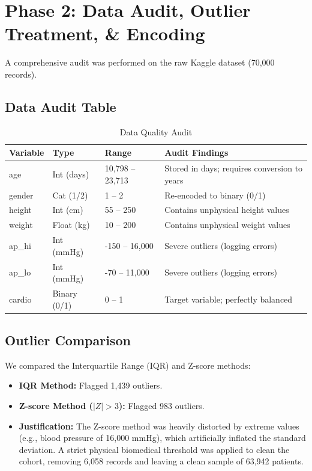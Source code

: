 \documentclass[11pt,a4paper]{article}
\begin{document}
\section{Phase 2: Data Audit, Outlier Treatment, \& Encoding}
A comprehensive audit was performed on the raw Kaggle dataset (70,000 records). 
\subsection{Data Audit Table}
\begin{table}[htbp]
\centering
\caption{Data Quality Audit}
\begin{tabular}{llll}
\toprule
Variable & Type & Range & Audit Findings \\
\midrule
age & Int (days) & 10,798 -- 23,713 & Stored in days; requires conversion to years \\
gender & Cat (1/2) & 1 -- 2 & Re-encoded to binary (0/1) \\
height & Int (cm) & 55 -- 250 & Contains unphysical height values \\
weight & Float (kg) & 10 -- 200 & Contains unphysical weight values \\
ap\_hi & Int (mmHg) & -150 -- 16,000 & Severe outliers (logging errors) \\
ap\_lo & Int (mmHg) & -70 -- 11,000 & Severe outliers (logging errors) \\
cardio & Binary (0/1) & 0 -- 1 & Target variable; perfectly balanced \\
\bottomrule
\end{tabular}
\end{table}

\subsection{Outlier Comparison}
We compared the Interquartile Range (IQR) and Z-score methods:
\begin{itemize}
    \item \textbf{IQR Method:} Flagged 1,439 outliers.
    \item \textbf{Z-score Method ($|Z| > 3$):} Flagged 983 outliers.
    \item \textbf{Justification:} The Z-score method was heavily distorted by extreme values (e.g., blood pressure of 16,000 mmHg), which artificially inflated the standard deviation. A strict physical biomedical threshold was applied to clean the cohort, removing 6,058 records and leaving a clean sample of 63,942 patients.
\end{itemize}
\end{document}
